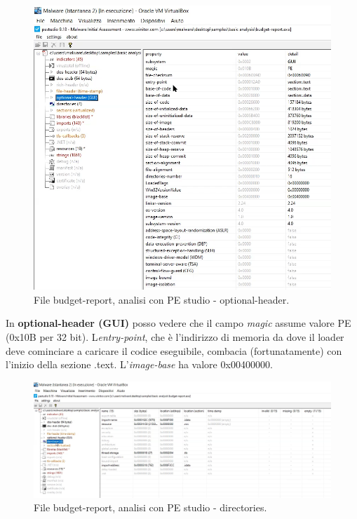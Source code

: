 \documentclass[a4paper]{book}
\begin{document}
\begin{figure}[p]
    \includegraphics[width=1\textwidth]{images/13-10/3.png}
    \caption{File budget-report, analisi con PE studio - optional-header.}
\end{figure}

In \textbf{optional-header (GUI)} posso vedere che il campo \textit{magic} assume valore PE (0x10B per 32 bit). L\textit{entry-point}, che è l'indirizzo di memoria da dove il loader deve cominciare a caricare il codice eseguibile, combacia (fortunatamente) con l'inizio della sezione .text. L'\textit{image-base} ha valore 0x00400000. 

\begin{figure}[p]
    \includegraphics[width=1\textwidth]{images/13-10/4.png}
    \caption{File budget-report, analisi con PE studio - directories.}
\end{figure}
\end{document}
